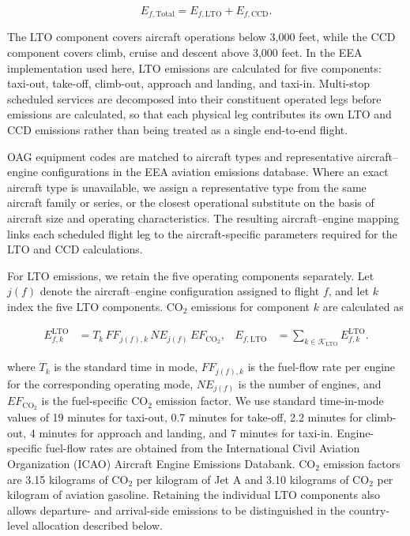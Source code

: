 \documentclass[12pt]{extarticle}
\begin{document}
\begin{equation}
E_{f,\mathrm{Total}}
=
E_{f,\mathrm{LTO}}
+
E_{f,\mathrm{CCD}} .
\label{eq:nature_1}
\end{equation}

The LTO component covers aircraft operations below 3,000 feet, while the CCD component covers climb, cruise and descent above 3,000 feet. In the EEA implementation used here, LTO emissions are calculated for five components: taxi-out, take-off, climb-out, approach and landing, and taxi-in. Multi-stop scheduled services are decomposed into their constituent operated legs before emissions are calculated, so that each physical leg contributes its own LTO and CCD emissions rather than being treated as a single end-to-end flight.

OAG equipment codes are matched to aircraft types and representative aircraft--engine configurations in the EEA aviation emissions database. Where an exact aircraft type is unavailable, we assign a representative type from the same aircraft family or series, or the closest operational substitute on the basis of aircraft size and operating characteristics. The resulting aircraft--engine mapping links each scheduled flight leg to the aircraft-specific parameters required for the LTO and CCD calculations.

For LTO emissions, we retain the five operating components separately. Let $j(f)$ denote the aircraft--engine configuration assigned to flight $f$, and let $k$ index the five LTO components. CO$_2$ emissions for component $k$ are calculated as

\begin{equation}
\begin{aligned}
E_{f,k}^{\mathrm{LTO}}
&=
T_k
\,FF_{j(f),k}
\,NE_{j(f)}
\,EF_{\mathrm{CO_2}},
&
E_{f,\mathrm{LTO}}
&=
\sum_{k\in\mathcal K_{\mathrm{LTO}}}
E_{f,k}^{\mathrm{LTO}}.
\end{aligned}
\label{eq:nature_2}
\end{equation}

where $T_k$ is the standard time in mode, $FF_{j(f),k}$ is the fuel-flow rate per engine for the corresponding operating mode, $NE_{j(f)}$ is the number of engines, and $EF_{\mathrm{CO_2}}$ is the fuel-specific CO$_2$ emission factor. We use standard time-in-mode values of 19 minutes for taxi-out, 0.7 minutes for take-off, 2.2 minutes for climb-out, 4 minutes for approach and landing, and 7 minutes for taxi-in. Engine-specific fuel-flow rates are obtained from the International Civil Aviation Organization (ICAO) Aircraft Engine Emissions Databank. CO$_2$ emission factors are 3.15 kilograms of CO$_2$ per kilogram of Jet A and 3.10 kilograms of CO$_2$ per kilogram of aviation gasoline. Retaining the individual LTO components also allows departure- and arrival-side emissions to be distinguished in the country-level allocation described below.
\end{document}
